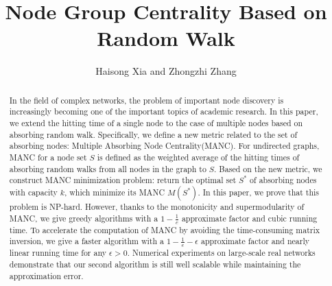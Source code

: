 \documentclass[sigconf]{acmart}
\begin{document}
\fancyhead{}
\title{Node Group Centrality Based on Random Walk}
\author{Haisong Xia and Zhongzhi Zhang \footnotemark}
\begin{abstract}
    In the field of complex networks, the problem of important node discovery is increasingly becoming one of the important topics of academic research.
    In this paper, we extend the hitting time of a single node to the case of multiple nodes based on absorbing random walk. Specifically, we define a new metric related to the set of absorbing nodes: Multiple Absorbing Node Centrality(MANC). For undirected graphs, MANC for a node set \(S\) is defined as the weighted average of the hitting times of absorbing random walks from all nodes in the graph to \(S\). Based on the new metric, we construct MANC minimization problem: return the optimal set \(S^*\) of absorbing nodes with capacity \(k\), which minimize its MANC \(M(S^*)\). In this paper, we prove that this problem is NP-hard. However, thanks to the monotonicity and supermodularity of MANC, we give greedy algorithms with a \(1-\frac{1}{e}\) approximate factor and cubic running time. To accelerate the computation of MANC by avoiding the time-consuming matrix inversion, we give a faster algorithm with a \(1-\frac{1}{e}-\epsilon\) approximate factor and nearly linear running time for any \(\epsilon>0\). Numerical experiments on large-scale real networks demonstrate that our second algorithm is still well scalable while maintaining the approximation error.
\end{abstract}
\maketitle
\renewcommand{\thefootnote}{*}
\end{document}
